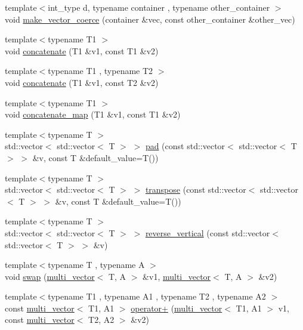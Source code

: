 \begin{DoxyCompactItemize}
\item 
{\footnotesize template$<$int\-\_\-type d, typename container , typename other\-\_\-container $>$ }\\void \hyperlink{namespaceIceBRG_aa5b2a2789b13159ed029d2fe742f0b0b}{make\-\_\-vector\-\_\-coerce} (container \&vec, const other\-\_\-container \&other\-\_\-vec)
\item 
{\footnotesize template$<$typename T1 $>$ }\\void \hyperlink{namespaceIceBRG_a27a64b4cc8310d5498bd80ca330e2376}{concatenate} (T1 \&v1, const T1 \&v2)
\item 
{\footnotesize template$<$typename T1 , typename T2 $>$ }\\void \hyperlink{namespaceIceBRG_a040abc5b8234609fbb702a63c5d84003}{concatenate} (T1 \&v1, const T2 \&v2)
\item 
{\footnotesize template$<$typename T1 $>$ }\\void \hyperlink{namespaceIceBRG_ad537c906b69ad9bf8a3b3a99ec3f8010}{concatenate\-\_\-map} (T1 \&v1, const T1 \&v2)
\item 
{\footnotesize template$<$typename T $>$ }\\std\-::vector$<$ std\-::vector$<$ T $>$ $>$ \hyperlink{namespaceIceBRG_aef9f2dd77b66243d70b9769d0d875a51}{pad} (const std\-::vector$<$ std\-::vector$<$ T $>$ $>$ \&v, const T \&default\-\_\-value=T())
\item 
{\footnotesize template$<$typename T $>$ }\\std\-::vector$<$ std\-::vector$<$ T $>$ $>$ \hyperlink{namespaceIceBRG_aea224837bf18bf302230391b70763000}{transpose} (const std\-::vector$<$ std\-::vector$<$ T $>$ $>$ \&v, const T \&default\-\_\-value=T())
\item 
{\footnotesize template$<$typename T $>$ }\\std\-::vector$<$ std\-::vector$<$ T $>$ $>$ \hyperlink{namespaceIceBRG_a519594af3e1f63d4e7b60cb3116d36a6}{reverse\-\_\-vertical} (const std\-::vector$<$ std\-::vector$<$ T $>$ $>$ \&v)
\item 
{\footnotesize template$<$typename T , typename A $>$ }\\void \hyperlink{namespaceIceBRG_a7493a46bbc68c3aa67603f1e453cb266}{swap} (\hyperlink{classIceBRG_1_1multi__vector}{multi\-\_\-vector}$<$ T, A $>$ \&v1, \hyperlink{classIceBRG_1_1multi__vector}{multi\-\_\-vector}$<$ T, A $>$ \&v2)
\item 
{\footnotesize template$<$typename T1 , typename A1 , typename T2 , typename A2 $>$ }\\const \hyperlink{classIceBRG_1_1multi__vector}{multi\-\_\-vector}$<$ T1, A1 $>$ \hyperlink{namespaceIceBRG_a5b38eff204dde0267a08172da735dc2c}{operator+} (\hyperlink{classIceBRG_1_1multi__vector}{multi\-\_\-vector}$<$ T1, A1 $>$ v1, const \hyperlink{classIceBRG_1_1multi__vector}{multi\-\_\-vector}$<$ T2, A2 $>$ \&v2)

\end{DoxyCompactItemize}
